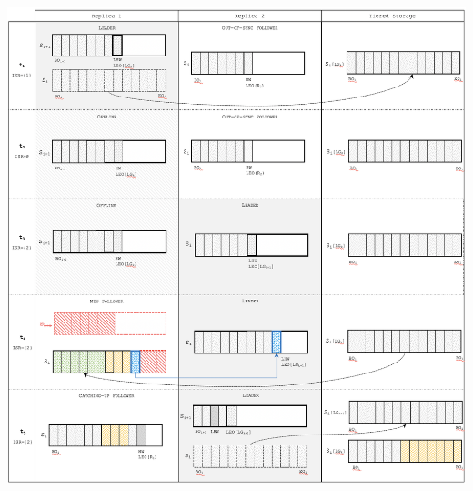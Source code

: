 \documentclass{article}
\begin{document}
\begin{center}
	\includegraphics[scale=0.45]{unclean1.png}
\end{center}
\end{document}
